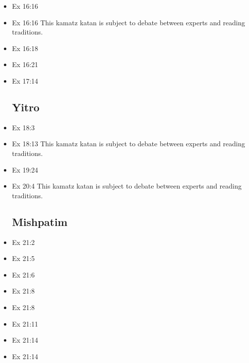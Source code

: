 \documentclass[14pt]{book}
\begin{document}
\begin{multicols}{2}
\begin{itemize}
\item Ex 16:16

\item Ex 16:16 This kamatz katan is subject to debate between experts and reading traditions.

\item Ex 16:18

\item Ex 16:21

\item Ex 17:14

\subsection{Yitro}

\item Ex 18:3

\item Ex 18:13 This kamatz katan is subject to debate between experts and reading traditions.

\item Ex 19:24

\item Ex 20:4 This kamatz katan is subject to debate between experts and reading traditions.

\subsection{Mishpatim}

\item Ex 21:2

\item Ex 21:5

\item Ex 21:6

\item Ex 21:8

\item Ex 21:8

\item Ex 21:11

\item Ex 21:14

\item Ex 21:14


\end{itemize}
\end{multicols}
\end{document}
